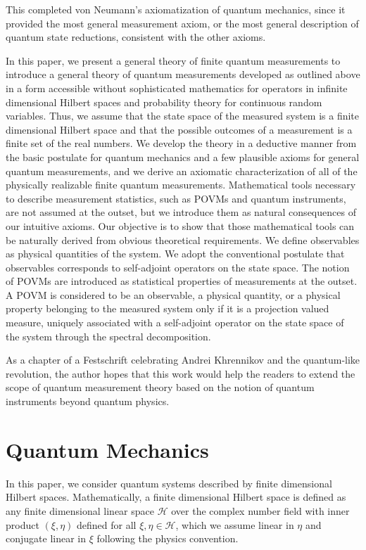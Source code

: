 \documentclass[graybox]{svmult}
\newcommand{\cH}{{\mathcal H}}
\newcommand{\et}{\eta}
\begin{document}
This completed von Neumann's axiomatization of quantum mechanics,
since it provided the most general measurement axiom, or the most
general description of quantum state reductions,  consistent with the
other axioms.

In this paper, we present a general theory of finite quantum measurements
to introduce a general theory of quantum measurements developed as outlined above 
in a form accessible 
without sophisticated mathematics for operators in infinite dimensional Hilbert spaces
and probability theory for continuous random variables.
Thus, we assume that the state space of the measured system is a finite dimensional Hilbert space
and that the possible outcomes of a measurement is a finite set of the real numbers.
We develop the theory in a deductive manner from the basic postulate for quantum 
mechanics and a few plausible axioms for general quantum measurements,
and we derive an axiomatic characterization of all of the physically realizable
finite quantum measurements. 
Mathematical tools necessary to describe measurement statistics, such as POVMs 
and quantum instruments, are not assumed at the outset, but we introduce
them as natural consequences of our intuitive axioms.  Our objective is to show 
that those mathematical tools can be naturally derived from obvious theoretical requirements.    
We define observables as physical quantities of the system. We adopt the
conventional postulate that observables corresponds to self-adjoint operators 
on the state space.  The notion of POVMs are introduced as statistical properties
of measurements at the outset. 
A POVM is considered to be an observable,  a physical quantity, 
or a physical property belonging to the measured system only if it is a projection valued
measure, uniquely associated with a self-adjoint operator on the state space of the
system through the spectral decomposition.

As a chapter of a Festschrift celebrating Andrei Khrennikov and 
the quantum-like revolution,  the author hopes that this work would help the readers 
to extend the scope of quantum measurement theory based on the notion of quantum 
instruments beyond quantum physics.

\section{Quantum Mechanics}

In this paper, we consider quantum systems described by finite dimensional Hilbert spaces.
Mathematically, a finite dimensional Hilbert space is defined as any finite dimensional
linear space $\cH$ over the complex number field with inner product $(\xi,\et)$ defined
for all $\xi,\et\in\cH$, which we assume linear in $\et$ and conjugate linear in $\xi$
 following the physics convention.
 
\end{document}
